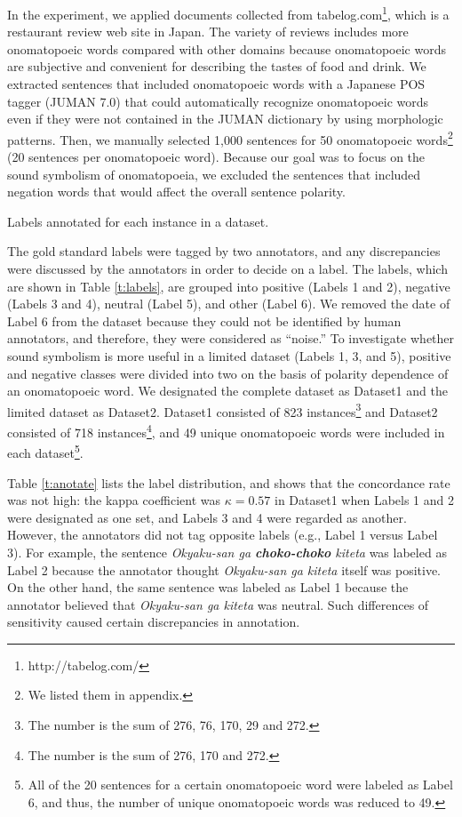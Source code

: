 \documentclass[english]{jnlp_1.4}
\begin{document}
In the experiment, we applied documents collected from tabelog.com\footnote{http://tabelog.com/}, which is a restaurant review web site in Japan.
The variety of reviews includes more onomatopoeic words compared with other domains because onomatopoeic words are subjective and convenient for describing the tastes of food and drink.
We extracted sentences that included onomatopoeic words with a Japanese POS tagger (JUMAN 7.0)
that could automatically recognize onomatopoeic words even if they were not contained in the JUMAN dictionary by using morphologic patterns.
Then, we manually selected 1,000 sentences for 50 onomatopoeic words\footnote{We listed them in appendix.} (20 sentences per onomatopoeic word).
Because our goal was to focus on the sound symbolism of onomatopoeia, we excluded the sentences that included negation words that would affect the overall sentence polarity.

\begin{table}[t]
\caption{Labels annotated for each instance in a dataset.}
\label{t:labels}

\end{table}

The gold standard labels were tagged by two annotators, and any discrepancies were discussed by the annotators in order to decide on a label.
The labels, which are shown in Table \ref{t:labels}, are grouped into positive (Labels 1 and 2), negative (Labels 3 and 4), neutral (Label 5), and other (Label 6).
We removed the date of Label 6 from the dataset because they could not be identified by human annotators, and therefore, they were considered as ``noise.''
To investigate whether sound symbolism is more useful in a limited dataset (Labels 1, 3, and 5),
positive and negative classes were divided into two on the basis of polarity dependence of an onomatopoeic word.
We designated the complete dataset as Dataset1 and the limited dataset as Dataset2.
Dataset1 consisted of 823 instances\footnote{The number is the sum of 276, 76, 170, 29 and 272.} and Dataset2 consisted of 718 instances\footnote{The number is the sum of 276, 170 and 272.}, and
49 unique onomatopoeic words were included in each dataset\footnote{All of the 20 sentences for a certain onomatopoeic word were labeled as Label 6, and thus, the number of unique onomatopoeic words was reduced to 49.}.

Table \ref{t:anotate} lists the label distribution, and shows that the concordance rate was not high:
the kappa coefficient was $\kappa = 0.57$ in Dataset1 when Labels 1 and 2 were designated as one set, and Labels 3 and 4 were regarded as another.
However, the annotators did not tag opposite labels (e.g., Label 1 versus Label 3).
For example, the sentence {\itshape Okyaku-san ga \textbf{choko-choko} kiteta} was labeled as Label 2 because the annotator thought {\it Okyaku-san ga kiteta} itself was positive.
On the other hand, the same sentence was labeled as Label 1 because the annotator believed that {\it Okyaku-san ga kiteta} was neutral.
Such differences of sensitivity caused certain discrepancies in annotation.
\end{document}
